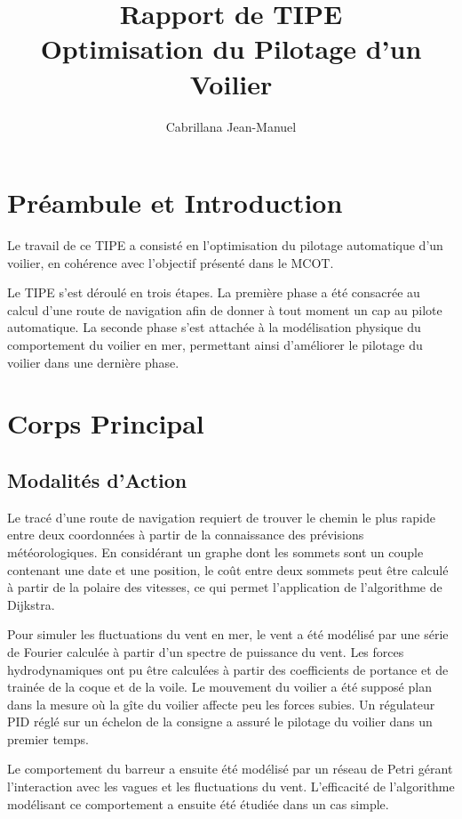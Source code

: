 \documentclass[12pt,a4paper]{article}
\title{Rapport de TIPE \\
Optimisation du Pilotage d'un Voilier}
\author{Cabrillana Jean-Manuel}
\begin{document}
\maketitle

\section{Préambule et Introduction}

  Le travail de ce TIPE a consisté en l'optimisation du pilotage automatique d'un voilier, en cohérence avec l'objectif présenté dans le MCOT.
  
  Le TIPE s'est déroulé en trois étapes. La première phase a été consacrée au calcul d'une route de navigation afin de donner à tout moment un cap au pilote automatique. La seconde phase s'est attachée à la modélisation physique du comportement du voilier en mer, permettant ainsi d'améliorer le pilotage du voilier dans une dernière phase.
  

\section{Corps Principal}

\subsection{Modalités d'Action}

	Le tracé d'une route de navigation requiert de trouver le chemin le plus rapide entre deux coordonnées à partir de la connaissance des prévisions météorologiques. En considérant un graphe dont les sommets sont un couple contenant une date et une position, le coût entre deux sommets peut être calculé à partir de la polaire des vitesses, ce qui permet l'application de l'algorithme de Dijkstra.
	
	Pour simuler les fluctuations du vent en mer, le vent a été modélisé par une série de Fourier calculée à partir d'un spectre de puissance du vent. Les forces hydrodynamiques ont pu être calculées à partir des coefficients de portance et de trainée de la coque et de la voile. Le mouvement du voilier a été supposé plan dans la mesure où la gîte du voilier affecte peu les forces subies. Un régulateur PID réglé sur un échelon de la consigne a assuré le pilotage du voilier dans un premier temps.

	Le comportement du barreur a ensuite été modélisé par un réseau de Petri gérant l'interaction avec les vagues et les fluctuations du vent. L'efficacité de l'algorithme modélisant ce comportement a ensuite été étudiée dans un cas simple.
\end{document}
